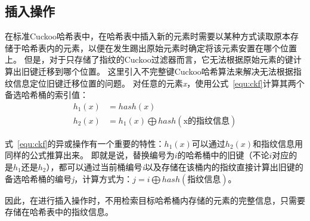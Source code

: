 \subsection{插入操作}
在标准Cuckoo哈希表中，在哈希表中插入新的元素时需要以某种方式读取原本存储于哈希表内的元素，以便在发生踢出原始元素时确定将该元素安置在哪个位置上。
但是，对于只存储了指纹的Cuckoo过滤器而言，它无法根据原始元素的键计算出旧键迁移到哪个位置。
这里引入不完整键Cuckoo哈希算法来解决无法根据指纹信息定位旧键迁移位置的问题。
对任意的元素\textit{x}，使用公式~\ref{equ:ckf}计算其两个备选哈希桶的索引值：
\begin{equation}
\begin{split}
h_1\left(x\right) &= hash\left(x\right) \\
h_2(x) &= h_1(x)\bigoplus hash(\text{x的指纹信息})
\end{split}
\label{equ:ckf}
\end{equation}

式~\ref{equ:ckf}的异或操作有一个重要的特性：$h_1(x)$可以通过$h_2(x)$和指纹信息用同样的公式推算出来。
即就是说，替换编号为$i$的哈希桶中的旧键（不论$i$对应的是$h_1$还是$h_2$），都可以通过当前桶编号\textit{i}以及存储在该桶内的指纹直接计算出旧键的备选哈希桶的编号\textit{j}，计算方式为：$j = i \bigoplus hash(\text{指纹信息})$。

因此，在进行插入操作时，不用检索目标哈希桶内存储的元素的完整信息，只需要存储在哈希表中的指纹信息。

